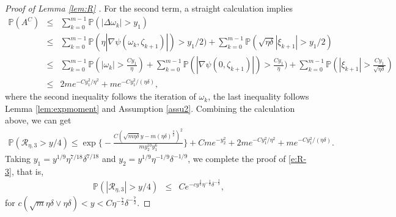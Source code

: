 \documentclass[12pt]{amsart}
\theoremstyle{definition}
\theoremstyle{remark}
\numberwithin{equation}{section}
\newcommand{\PP}{\mathbb{P}}
\begin{document}
\begin{proof}[Proof of Lemma \ref{lem:R} ]
	
	 For the second term, a straight calculation implies
	\begin{eqnarray*}
		\PP(A^C)&\le&\sum_{k=0}^{m-1}\PP(|\Delta \omega_k|>y_1)\\
		&\le&\sum_{k=0}^{m-1}\PP(\eta|\nabla \psi(\omega_k,\zeta_{k+1})|)>y_1/2)+\sum_{k=0}^{m-1}\PP(\sqrt{\eta\delta}|\xi_{k+1}|>y_1/2)\\
		&\le& \sum_{k=0}^{m-1}\PP( |\omega_k|>\frac{Cy_1}\eta)+\sum_{k=0}^{m-1}\PP(|\nabla\psi(0,\zeta_{k+1})|)>\frac{Cy_1}\eta)+\sum_{k=0}^{m-1}\PP(|\xi_{k+1}|>\frac{Cy_1}{\sqrt{\eta\delta}})\\
		&\le& 2me^{-Cy_1^2/\eta^2}+me^{-Cy_1^2/(\eta\delta)},
	\end{eqnarray*}
	where the second inequality follows the iteration of $\omega_k$, the last inequality follows Lemma \ref{lem:expmoment} and Assumption \ref{assu2}. Combining the calculation above, we can get
	\begin{eqnarray*}
		\PP(\mathcal{R}_{\eta,3}>y/4)\le \exp\big\{-\frac{C(\sqrt{m\eta\delta}y-m(\eta\delta)^{\frac32})^2}{my_2^{10}y_1^6}\big\}+Cme^{-y_2^2}+2me^{-Cy_1^2/\eta^2}+me^{-Cy_1^2/(\eta\delta)}.
	\end{eqnarray*}
	Taking $y_1=y^{1/9}\eta^{7/18}\delta^{7/18} $ and $y_2= y^{1/9}\eta^{-1/9}\delta^{-1/9}$, we complete the proof of \eqref{e:R-3}, that is,
	\begin{eqnarray*}
		\PP\left(\left\vert\mathcal{R}_{\eta,3}\right\vert >y/4\right)& \le & Ce^{-cy^{\frac29}\eta^{-\frac2{9}}\delta^{-\frac2{9}}} ,
	\end{eqnarray*}
	for  $c(\sqrt{m}\eta\delta \vee \eta\delta) <y<C\eta^{-\frac72}\delta^{-\frac72}$.
	

\end{proof}
\end{document}
